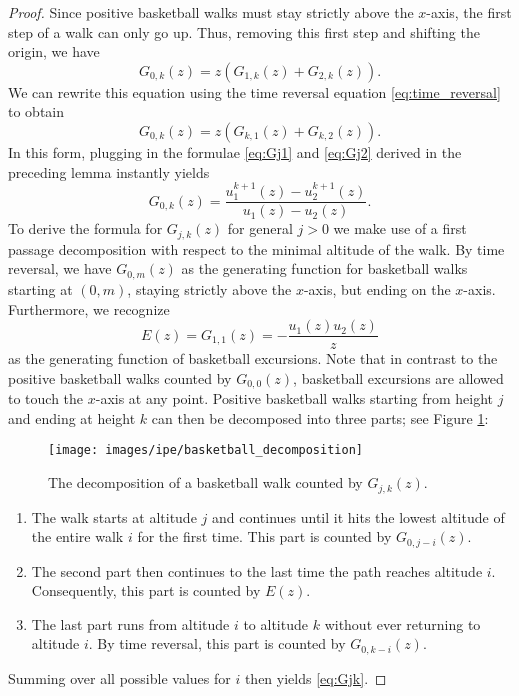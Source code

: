 \begin{proof}
  Since positive basketball walks must stay strictly above the $x$-axis, the first step of a walk can only go up.
  Thus, removing this first step and shifting the origin, we have
  $$
    G_{0,k}(z) = z(G_{1,k}(z) + G_{2,k}(z)).
  $$
  We can rewrite this equation using the time reversal equation \eqref{eq:time_reversal} to obtain
  $$
    G_{0,k}(z) = z(G_{k,1}(z) + G_{k,2}(z)).
  $$
  In this form, plugging in the formulae \eqref{eq:Gj1} and \eqref{eq:Gj2} derived in the preceding lemma instantly yields 
  $$
    G_{0,k}(z) = \frac{u_{1}^{k+1}(z) - u_{2}^{k+1}(z)}{u_{1}(z) - u_{2}(z)}.
  $$
  To derive the formula for $G_{j,k}(z)$ for general $j > 0$ we make use of a first passage decomposition with respect to the minimal altitude of the walk. 
  By time reversal, we have $G_{0,m}(z)$ as the generating function for basketball walks starting at $(0,m)$, staying strictly above the $x$-axis, but ending on the $x$-axis.
  Furthermore, we recognize
  $$
  E(z) = G_{1,1}(z) = -\frac{u_{1}(z) u_{2}(z)}{z}
  $$ 
  as the generating function of basketball excursions. Note that in contrast to the positive basketball walks counted by $G_{0,0}(z)$, basketball excursions are allowed to touch the $x$-axis at any point. 
  Positive basketball walks starting from height $j$ and ending at height $k$ can then be decomposed into three parts; see Figure \ref{fig:basketball_decomposition}:

  \begin{figure}
    \centering
    \texttt{[image: images/ipe/basketball\_decomposition]}
    \caption{The decomposition of a basketball walk counted by $G_{j,k}(z)$.}
    \label{fig:basketball_decomposition}
  \end{figure}

  \begin{enumerate}
    \item The walk starts at altitude $j$ and continues until it hits the lowest altitude of the entire walk $i$ for the first time. This part is counted by $G_{0,j-i}(z)$.
    \item The second part then continues to the last time the path reaches altitude $i$. Consequently, this part is counted by $E(z)$.
    \item The last part runs from altitude $i$ to altitude $k$ without ever returning to altitude $i$. By time reversal, this part is counted by $G_{0,k-i}(z)$.
  \end{enumerate}
  Summing over all possible values for $i$ then yields \eqref{eq:Gjk}.
\end{proof}

